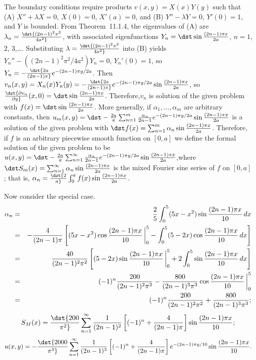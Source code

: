 \documentclass[dvips]{book}
\renewcommand{\exer}[1]{\par\medskip\;\noindent{\color{red}\bf #1.}}
\numberwithin{example}{section}
\numberwithin{equation}{section}
\numberwithin{theorem}{section}
\numberwithin{table}{section}
\numberwithin{figure}{section}
\newcommand{\lims}[2]{\,\bigg|_{#1}^{#2}}
\begin{document}
\exer{12.3.34}
The boundary conditions require products $v(x,y)=X(x)Y(y)$
such that
(A)  $X''+\lambda X=0$, $X(0)=0$, $X'(a)=0$, and
(B)  $Y''-\lambda Y=0$, $Y'(0)=1$, and $Y$ is bounded.
From Theorem~11.1.4, the eigenvalues of (A) are
$\lambda_n=\dst{(2n-1)^2\pi^2\over4a^2}$, with associated
eigenfunctions
$Y_n=\dst\sin{(2n-1)\pi x\over2a}$, $n=1$, $2$, $3$,\dots.
Substituting $\lambda=\dst{(2n-1)^2\pi^2\over4a^2}$  into (B) yields
$Y_n''-((2n-1)^2\pi^2/4a^2)Y_n=0$, $Y_n'(0)=1$, so
$Y_n=-\dst {2a\over(2n-1)\pi}e^{-(2n-1)\pi y/2a}$. Then
$v_n(x,y)=X_n(x)Y_n(y)=-\dst {2a\over(2n-1)\pi}e^{-(2n-1)\pi y/2a}
\sin{(2n-1)\pi x\over2a}$, so
$\dst{\partial v_n\over\partial y}(x,0)=\dst\sin{(2n-1)\pi x\over2a}$.
Therefore,$v_n$ is solution of the given problem  with
$f(x)=\dst\sin{(2n-1)\pi x\over2a}$. More generally,
 if $\alpha_1,\dots,\alpha_m$ are arbitrary constants,
then
$u_m(x,y)=\dst-{2a\over\pi}\sum_{n=1}^m{\alpha_n\over2n-1}e^{-(2n-1)\pi
y/2a}\sin
{(2n-1)\pi x\over2a}$
 is a solution of the given problem with
$\dst f(x)=\sum_{n=1}^m\alpha_n\sin{(2n-1)\pi x\over2a}$.
Therefore, if $f$ is an arbitrary piecewise smooth function on
$[0,a]$  we define the formal solution of the given problem  to be
$u(x,y)=\dst-{2a\over\pi}\sum_{n=1}^\infty{\alpha_n\over2n-1}e^{-(2n-1)\pi
y/2a}\sin
{(2n-1)\pi x\over2a}$,where
$\dst S_m(x)=\sum_{n=1}^\infty \alpha_n\sin{(2n-1)\pi x\over2a}$
is the mixed Fourier  sine series of $f$ on $[0,a]$; that is,
$\alpha_n=\dst{2\over a}\int_0^a f(x)\sin{(2n-1)\pi x\over2a}$.

Now consider the special case.
\begin{eqnarray*}
\alpha_n&=&{2\over 5}\int_0^5(5x-x^2)\sin{(2n-1)\pi x\over10}\,dx\\
&=&-{4\over(2n-1)\pi}\left[(5x-x^2)\cos{(2n-1)\pi
x\over10}\lims05-
\int_0^5
(5-2x)\cos{(2n-1)\pi x\over10}\,dx\right]\\
&=&{40\over(2n-1)^2\pi^2}\left[(5-2x)\sin{(2n-1)\pi
x\over10}\lims05+2
\int_0^5\sin{(2n-1)\pi x\over10}\,dx\right]\\
&=&(-1)^n{200\over(2n-1)^2\pi^2}-
{800\over(2n-1)^3\pi^3}\cos{(2n-1)\pi x\over10}\lims05\\
&=&(-1)^n{200\over(2n-1)^2\pi^2}
+{800\over(2n-1)^3\pi^3};
\end{eqnarray*}
$$
S_M(x)=\dst{200\over\pi^2}\sum_{n=1}^\infty{1\over(2n-1)^2}\left[
(-1)^n+{4\over(2n-1)\pi}\right]\sin{(2n-1)\pi
x\over10};
$$
$$
u(x,y)=-\dst{2000\over\pi^3}\sum_{n=1}^\infty{1\over(2n-1)^3}\left[
(-1)^n+{4\over(2n-1)\pi}\right]e^{-(2n-1)\pi y/10}\sin{(2n-1)\pi
x\over10}.
$$
\end{document}
